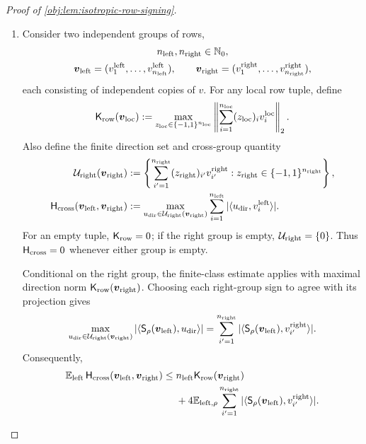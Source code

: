 \begin{proof}[Proof of \cref{obj:lem:isotropic-row-signing}]
\begin{enumerate}
\item Consider two independent groups of rows,
\[
\begin{gathered}
n_{\rm left},n_{\rm right}\in\mathbb N_0,\\
\boldsymbol v_{\rm left}
=(v^{\rm left}_1,\ldots,v^{\rm left}_{n_{\rm left}}),
\qquad
\boldsymbol v_{\rm right}
=(v^{\rm right}_1,\ldots,v^{\rm right}_{n_{\rm right}}),
\end{gathered}
\]
each consisting of independent copies of \(v\). For any local row tuple, define
\[
\mathsf K_{\rm row}(\boldsymbol v_{\rm loc})
:=
\max_{z_{\rm loc}\in\{-1,1\}^{n_{\rm loc}}}
\left\|\sum_{i=1}^{n_{\rm loc}}
(z_{\rm loc})_i v_i^{\rm loc}\right\|_2.
\]
Also define the finite direction set and cross-group quantity
\[
\begin{aligned}
\mathcal U_{\rm right}(\boldsymbol v_{\rm right})
&:=
\left\{\sum_{i'=1}^{n_{\rm right}}
(z_{\rm right})_{i'}v_{i'}^{\rm right}:
z_{\rm right}\in\{-1,1\}^{n_{\rm right}}\right\},\\
\mathsf H_{\rm cross}(\boldsymbol v_{\rm left},\boldsymbol v_{\rm right})
&:=
\max_{u_{\rm dir}\in\mathcal U_{\rm right}(\boldsymbol v_{\rm right})}
\sum_{i=1}^{n_{\rm left}}
|\langle u_{\rm dir},v_i^{\rm left}\rangle|.
\end{aligned}
\]
For an empty tuple, \(\mathsf K_{\rm row}=0\); if the right group is empty, \(\mathcal U_{\rm right}=\{0\}\). Thus \(\mathsf H_{\rm cross}=0\) whenever either group is empty.

Conditional on the right group, the finite-class estimate applies with maximal direction norm \(\mathsf K_{\rm row}(\boldsymbol v_{\rm right})\). Choosing each right-group sign to agree with its projection gives
\[
\max_{u_{\rm dir}\in\mathcal U_{\rm right}(\boldsymbol v_{\rm right})}
|\langle\mathsf S_\rho(\boldsymbol v_{\rm left}),u_{\rm dir}\rangle|
=
\sum_{i'=1}^{n_{\rm right}}
|\langle\mathsf S_\rho(\boldsymbol v_{\rm left}),v_{i'}^{\rm right}\rangle|.
\]
Consequently,
\[
\begin{aligned}
\mathbb E_{\rm left}\,
\mathsf H_{\rm cross}(\boldsymbol v_{\rm left},\boldsymbol v_{\rm right})
\leq{}&
n_{\rm left}\mathsf K_{\rm row}(\boldsymbol v_{\rm right})\\
&+4\mathbb E_{{\rm left},\rho}
\sum_{i'=1}^{n_{\rm right}}
|\langle\mathsf S_\rho(\boldsymbol v_{\rm left}),v_{i'}^{\rm right}\rangle|.
\end{aligned}
\]


\end{enumerate}
\end{proof}
